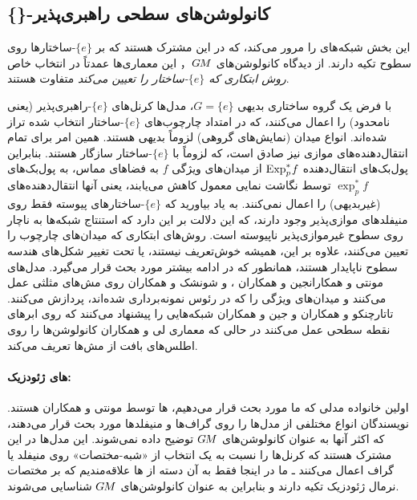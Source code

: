

\subsection{\{\}-کانولوشن‌های سطحی راهبری‌پذیر}
\label{sec:e_surface_conv}


این بخش شبکه‌های \cite{monti2017geometric,jin2018learning,schonsheck2018parallel,tatarchenko2018tangent,jin2019NPTCnet,li2019crossAtlas} را مرور می‌کند،
که در این مشترک هستند که بر $\{e\}$-ساختارها روی سطوح تکیه دارند.
از دیدگاه کانولوشن‌های $G\mkern-1.4muM$， این معماری‌ها عمدتاً در انتخاب خاص \emph{روش ابتکاری که $\{e\}$-ساختار را تعیین می‌کند} متفاوت هستند.


با فرض یک گروه ساختاری بدیهی $G=\{e\}$، مدل‌ها کرنل‌های $\{e\}$-راهبری‌پذیر (یعنی نامحدود) را اعمال می‌کنند، که در امتداد چارچوب‌های $\{e\}$-ساختار انتخاب شده تراز شده‌اند.
انواع میدان (نمایش‌های گروهی) لزوماً بدیهی هستند.
همین امر برای تمام انتقال‌دهنده‌های موازی نیز صادق است، که لزوماً با $\{e\}$-ساختار سازگار هستند.
بنابراین پول‌بک‌های انتقال‌دهنده $\operatorname{Exp}^*_p\mkern-2mu f$ از میدان‌های ویژگی $f$ به فضاهای مماس، به پول‌بک‌های $\exp_p^*f$ توسط نگاشت نمایی معمول کاهش می‌یابند، یعنی آنها انتقال‌دهنده‌های (غیربدیهی) را اعمال نمی‌کنند.
به یاد بیاورید که $\{e\}$-ساختارهای پیوسته فقط روی منیفلدهای موازی‌پذیر وجود دارند، که این دلالت بر این دارد که استنتاج شبکه‌ها به ناچار روی سطوح غیرموازی‌پذیر ناپیوسته است.
روش‌های ابتکاری که میدان‌های چارچوب را تعیین می‌کنند، علاوه بر این، همیشه خوش‌تعریف نیستند، یا تحت تغییر شکل‌های هندسه سطوح ناپایدار هستند، همانطور که در ادامه بیشتر مورد بحث قرار می‌گیرد.
مدل‌های مونتی و همکاران\cite{monti2017geometric}جین و همکاران ، \cite{jin2018learning} و شونشک و همکاران\cite{schonsheck2018parallel} روی مش‌های مثلثی عمل می‌کنند و میدان‌های ویژگی را که در رئوس نمونه‌برداری شده‌اند، پردازش می‌کنند.
تاتارچنکو و همکاران\cite{tatarchenko2018tangent}  و جین و همکاران \cite{jin2019NPTCnet} شبکه‌هایی را پیشنهاد می‌کنند که روی ابرهای نقطه سطحی عمل می‌کنند در حالی که معماری لی و همکاران\cite{li2019crossAtlas} کانولوشن‌ها را روی اطلس‌های بافت از مش‌ها تعریف می‌کند.





\paragraph{های ژئودزیک:}
اولین خانواده مدلی که ما مورد بحث قرار می‌دهیم، \emph{}ها توسط مونتی و همکاران\cite{monti2017geometric} هستند.
نویسندگان انواع مختلفی از مدل‌ها را روی گراف‌ها و منیفلدها مورد بحث قرار می‌دهند، که اکثر آنها به عنوان کانولوشن‌های $G\mkern-1.4muM$ توضیح داده نمی‌شوند.
این مدل‌ها در این مشترک هستند که کرنل‌ها را نسبت به یک انتخاب از «شبه-مختصات» روی منیفلد یا گراف اعمال می‌کنند
ـ ما در اینجا فقط به آن دسته از ها علاقه‌مندیم که بر مختصات نرمال ژئودزیک تکیه دارند و بنابراین به عنوان کانولوشن‌های $G\mkern-1.4muM$ شناسایی می‌شوند.

